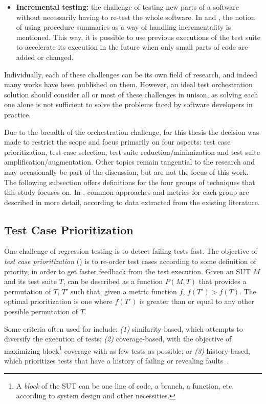\begin{itemize}
	\item \textbf{Incremental testing:} the challenge of testing new parts of a software without necessarily having to re-test the whole software. In \cite{harman_start-ups_2018} and \cite{ohearn_continuous_2018}, the notion of using procedure summaries as a way of handling incrementality is mentioned. This way, it is possible to use previous executions of the test suite to accelerate its execution in the future when only small parts of code are added or changed.
\end{itemize}

Individually, each of these challenges can be its own field of research, and indeed many works have been published on them.
However, an ideal test orchestration solution should consider all or most of these challenges in unison, as solving each one alone is not sufficient to solve the problems faced by software developers in practice.

Due to the breadth of the orchestration challenge, for this thesis the decision was made to restrict the scope and focus primarily on four aspects: test case prioritization, test case selection, test suite reduction/minimization and test suite amplification/augmentation.
Other topics remain tangential to the research and may occasionally be part of the discussion, but are not the focus of this work.
The following subsection offers definitions for the four groups of techniques that this study focuses on.
In , common approaches and metrics for each group are described in more detail, according to data extracted from the existing literature.

\subsection{Test Case Prioritization}
\label{sec:tcp}

One challenge of regression testing is to detect failing tests fast.
The objective of \textit{test case prioritization} (\tcp) is to re-order test cases according to some definition of priority, in order to get faster feedback from the test execution.
Given an SUT $M$ and its test suite $T$,
\tcp can be described as a function $P(M, T)$ that provides a permutation of $T$, $T'$ such that, given a metric function $f$, $f(T') > f(T)$.
The optimal prioritization is one where $f(T')$ is greater than or equal to any other possible permutation of $T$. 

Some criteria often used for \tcp include: \textit{(1)} similarity-based, which attempts to diversify the execution of tests; \textit{(2)} coverage-based, with the objective of maximizing block\footnote{A \textit{block} of the SUT can be one line of code, a branch, a function, etc. according to system design and other necessities.} coverage with as few tests as possible; or \textit{(3)} history-based, which prioritizes tests that have a history of failing or revealing faults~\cite{khatibsyarbini_test_2018}.

